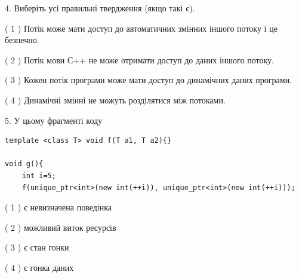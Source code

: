 \documentclass[12pt, ukrainian]{article}
\begin{document}
\begin {large}
{%
4. Виберіть усі правильні твердження (якщо такі є).\par
\vspace{2mm}

( 1 ) Потік може мати доступ до автоматичних змінних іншого потоку і це безпечно.%

( 2 ) Потік мови С++ не може отримати доступ до даних іншого потоку.%

( 3 ) Кожен потік програми може мати доступ до динамічних даних програми.%

( 4 ) Динамічні змінні не можуть розділятися між потоками.%


5. У цьому фрагменті коду
\begin{verbatim}
template <class T> void f(T a1, T a2){}

void g(){
    int i=5;
    f(unique_ptr<int>(new int(++i)), unique_ptr<int>(new int(++i)));
\end{verbatim}

( 1 ) є невизначена поведінка%

( 2 ) можливий виток ресурсів%

( 3 ) є стан гонки%

( 4 ) є гонка даних%
}
\end {large}
\end{document}
